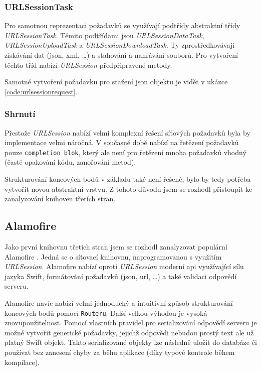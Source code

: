 
\subsubsection*{URLSessionTask}

Pro samotnou reprezentaci požadavků se využívají podtřídy abstraktní třídy \textit{URLSessionTask}.
Těmito podtřídami jsou \textit{URLSessionDataTask}, \textit{URLSessionUploadTask} a \textit{URLSessionDownloadTask}.
Ty zprostředkovávají získávání dat (\acrshort{json}, \acrshort{xml}, \ldots) a stahování a nahrávání souborů.
Pro vytvoření těchto tříd nabízí \textit{URLSession} předpřipravené metody.

Samotné vytvoření požadavku pro stažení \acrshort{json} objektu je vidět v ukázce \ref{code:urlsessionrequest}.


\subsubsection*{Shrnutí}

Přestože \textit{URLSession} nabízí velmi komplexní řešení síťových požadavků byla by implementace velmi náročná.
V současné době nabízí na řetězení požadavků pouze \texttt{completion blok}, který ale není pro řetězení mnoha požadavků vhodný (časté opakování kódu, zanořování metod).

Strukturování koncových bodů v základu také není řešené, bylo by tedy potřeba vytvořit novou abstraktní vrstvu.
Z tohoto důvodu jsem se rozhodl přistoupit ke zanalyzování knihoven třetích stran.

\subsection{Alamofire}

Jako první knihovnu třetích stran jsem se rozhodl zanalyzovat populární Alamofire \cite{github-alamofire}.
Jedná se o síťovací knihovnu, naprogramovanou s využitím \textit{URLSession}.
Alamofire nabízí oproti \textit{URLSession} moderní \acrshort{api} využívající sílu jazyka Swift, formátování požadavků (\acrshort{json}, \acrshort{url}, \ldots) a také validaci odpovědí serveru.

Alamofire navíc nabízí velmi jednoduchý a intuitivní způsob strukturování koncových bodů pomocí \texttt{Routeru}.
Další velkou výhodou je vysoká znovupoužitelnost.
Pomocí vlastních pravidel pro serializování odpovědí serveru je možné vytvořit generické požadavky, jejichž odpovědi nebudou prostý text ale už platný Swift objekt.
Takto serializované objekty lze následně uložit do databáze či používat bez zanesení chyby za běhu aplikace (díky typové kontrole během kompilace).

